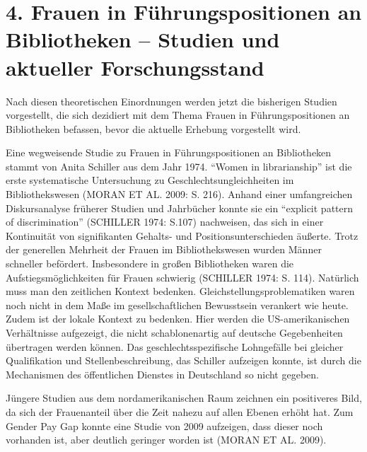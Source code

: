 \documentclass[a4paper,
fontsize=11pt,
oneside,
numbers=noperiodatend,
parskip=half-,
bibliography=totoc,
final
]{scrartcl}
\begin{document}
\hypertarget{frauen-in-fuxfchrungspositionen-an-bibliotheken-studien-und-aktueller-forschungsstand}{%
\section{4. Frauen in Führungspositionen an Bibliotheken --
Studien und aktueller
Forschungsstand}\label{frauen-in-fuxfchrungspositionen-an-bibliotheken-studien-und-aktueller-forschungsstand}}

Nach diesen theoretischen Einordnungen werden jetzt die bisherigen
Studien vorgestellt, die sich dezidiert mit dem Thema Frauen in
Führungspositionen an Bibliotheken befassen, bevor die aktuelle Erhebung
vorgestellt wird.

Eine wegweisende Studie zu Frauen in Führungspositionen an Bibliotheken
stammt von Anita Schiller aus dem Jahr 1974. \enquote{Women in
librarianship} ist die erste systematische Untersuchung zu
Geschlechtsungleichheiten im Bibliothekswesen (MORAN ET AL. 2009: S.
216). Anhand einer umfangreichen Diskursanalyse früherer Studien und
Jahrbücher konnte sie ein \enquote{explicit pattern of discrimination}
(SCHILLER 1974: S.107) nachweisen, das sich in einer Kontinuität von
signifikanten Gehalts- und Positionsunterschieden äußerte. Trotz der
generellen Mehrheit der Frauen im Bibliothekswesen wurden Männer
schneller befördert. Insbesondere in großen Bibliotheken waren die
Aufstiegsmöglichkeiten für Frauen schwierig (SCHILLER 1974: S. 114).
Natürlich muss man den zeitlichen Kontext bedenken.
Gleichstellungsproblematiken waren noch nicht in dem Maße im
gesellschaftlichen Bewusstsein verankert wie heute. Zudem ist der lokale
Kontext zu bedenken. Hier werden die US-amerikanischen Verhältnisse
aufgezeigt, die nicht schablonenartig auf deutsche Gegebenheiten
übertragen werden können. Das geschlechtsspezifische Lohngefälle bei
gleicher Qualifikation und Stellenbeschreibung, das Schiller aufzeigen
konnte, ist durch die Mechanismen des öffentlichen Dienstes in
Deutschland so nicht gegeben.

Jüngere Studien aus dem nordamerikanischen Raum zeichnen ein positiveres
Bild, da sich der Frauenanteil über die Zeit nahezu auf allen Ebenen
erhöht hat. Zum Gender Pay Gap konnte eine Studie von 2009 aufzeigen,
dass dieser noch vorhanden ist, aber deutlich geringer worden ist (MORAN
ET AL. 2009).
\end{document}
